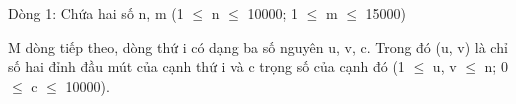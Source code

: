 Dòng 1: Chứa hai số n, m (1  $\le$  n  $\le$  10000; 1  $\le$  m  $\le$  15000)  

   M dòng tiếp theo, dòng thứ i có dạng ba số nguyên u, v, c. Trong đó (u, v) là chỉ số hai đỉnh đầu mút của cạnh thứ i và c trọng số của cạnh đó (1  $\le$  u, v  $\le$  n; 0  $\le$  c  $\le$  10000).  

\